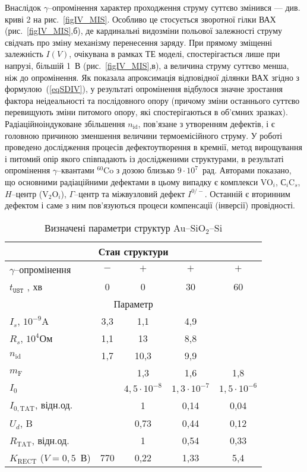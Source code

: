 Внаслідок $\gamma$--опромінення характер проходження струму суттєво змінився --- див. криві 2 на рис.~\ref{figIV_MIS}.
Особливо це стосується зворотної гілки ВАХ (рис.~\ref{figIV_MIS},б), де кардинальні видозміни польової залежності струму свідчать про зміну механізму перенесення заряду.
При прямому зміщенні залежність $I(V)$, очікувана в рамках ТЕ моделі, спостерігається лише при напрузі, більшій 1~В (рис.~\ref{figIV_MIS},в), а величина струму суттєво менша, ніж до опромінення.
Як показала апроксимація відповідної ділянки ВАХ згідно з формулою~(\ref{eqSDIV}), у результаті опромінення відбулося значне  зростання фактора неідеальності та послідовного опору (причому зміни останнього суттєво перевищують зміни питомого опору, які спостерігаються в об'ємних зразках).
Радіаційноіндуковане збільшення $n_\mathrm{id}$, пов'язане з утворенням дефектів, і є головною причиною зменшення величини термоемісійного струму.
У роботі \cite{FZSi:Rad} проведено дослідження процесів дефектоутворення в кремнії, метод вирощування і питомий опір якого співпадають із дослідженими структурами, в результаті опромінення $\gamma$--квантами $^{60}$Co з дозою близько $9\cdot10^7$~рад.
Авторами  показано, що основними радіаційними дефектами в цьому випадку є комплекси VO$_i$, С$_i$C$_s$, $H$--центр (V$_2$O$_i$), $\Gamma$--центр та міжвузловий дефект $I^{0/-}$.
Останній є вторинним дефектом і саме з ним пов'язуються процеси компенсації (інверсії) провідності.


\begin{table}
\caption{\label{tabMIS}Визначені параметри структур Au--SiO$_2$--Si
}
\center
\begin{tabular}{|l|c|c|c|c|}
\hline
\multicolumn{5}{|c|}{Стан структури}\\\hline
$\gamma$--опромінення&$-$&$+$&$+$&$+$\\ \hline
$t_\mathtt{UST}$ , хв&0&0&30&60\\ \hline
\multicolumn{5}{|c|}{Параметр}\\\hline
$I_s$, $10^{-9}$A & 3,3& 1,1& 4,9& \\ \hline
$R_s$, $10^{4}$Ом & 1,1& 13& 8,8& \\ \hline
$n_\mathrm{id}$ & 1,7& 10,3& 9,9& \\ \hline
$m_\mathrm{F}$ & &1,3& 1,6& 1,8 \\ \hline
$I_0$ & &$4,5\cdot10^{-8}$& $1,3\cdot10^{-7}$& $1,5\cdot10^{-6}$ \\ \hline
$I_{0,\mathrm{TAT}}$, відн.од. & &1& 0,14& 0,04 \\ \hline
$U_d$, B & &0,73& 0,44& 0,12 \\ \hline
$R_\mathrm{TAT}$, відн.од. & &1& 0,54& 0,33 \\ \hline
$K_\mathrm{RECT}$ ($V=0,5$~В)&770 &0,22& 1,33& 5,4 \\ \hline
\end{tabular}
\end{table}



